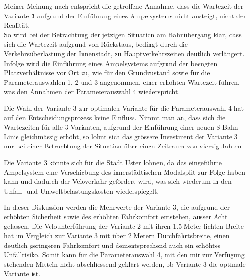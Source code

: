 Meiner Meinung nach entspricht die getroffene Annahme, dass die Wartezeit der Variante 3 aufgrund der Einführung eines Ampelsystems nicht ansteigt, nicht der Realität. \\
So wird bei der Betrachtung der jetzigen Situation am Bahnübergang klar, dass sich die Wartezeit aufgrund von Rückstaus, bedingt durch die Verkehrsüberlastung der Innenstadt, zu Hauptverkehrszeiten deutlich verlängert. Infolge wird die Einführung eines Ampelsystems aufgrund der beengten Platzverhältnisse vor Ort zu, wie für den Grundzustand sowie für die Parameterauswahlen 1, 2 und 3 angenommen, einer erhöhten Wartezeit führen, was den Annahmen der Parameterauswahl 4 wiederspricht.

Die Wahl der Variante 3 zur optimalen Variante für die Parameterauswahl 4 hat auf den Entscheidungsprozess keine Einfluss. Nimmt man an, dass sich die Wartezeiten für alle 3 Varianten, aufgrund der Einführung einer neuen S-Bahn Linie gleichmässig erhöht, so lohnt sich das grössere Investment der Variante 3 nur bei einer Betrachtung der Situation über einen Zeitraum von vierzig Jahren. 

Die Variante 3 könnte sich für die Stadt Uster lohnen, da das eingeführte Ampelsystem eine Verschiebung des innerstädtischen Modalsplit zur Folge haben kann und dadurch der Veloverkehr gefördert wird, was sich wiederum in den Unfall- und Umweltbelastungskosten wiederspiegelt.

In dieser Diskussion werden die Mehrwerte der Variante 3, die aufgrund der erhöhten Sicherheit sowie des erhöhten Fahrkomfort entstehen, ausser Acht gelassen. Die Velounterführung der Variante 2 mit ihren 1.5 Meter lichten Breite hat im Vergleich zur Variante 3 mit über 2 Metern Durchfahrtsbreite, einen deutlich geringeren Fahrkomfort und dementsprechend auch ein erhöhtes Unfallrisiko. Somit kann für die Parameterauswahl 4, mit den mir zur Verfügung stehenden Mitteln nicht abschliessend geklärt werden, ob  Variante 3 die optimale Variante ist.
      

%

